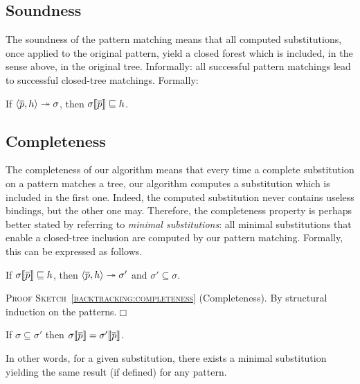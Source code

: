\subsection{Soundness}

The soundness of the pattern matching means that all computed
substitutions, once applied to the original pattern, yield a closed
forest which is included, in the sense above, in the original
tree. Informally: all successful pattern matchings lead to successful
closed\hyp{}tree matchings. Formally:
\begin{theorem}[Soundness]\hfill
\label{backtracking:soundness}
\begin{center}
If \(\smat{h}{\overline{p}} \twoheadrightarrow \sigma\),
then \(\subst{\overline{p}}{\sigma} \sqsubseteq h\).
\end{center}
\end{theorem}



\subsection{Completeness}

The completeness of our algorithm means that every time a complete
substitution on a pattern matches a tree, our algorithm computes a
substitution which is included in the first one. Indeed, the computed
substitution never contains useless bindings, but the other one
may. Therefore, the completeness property is perhaps better stated by
referring to \emph{minimal substitutions}: all minimal substitutions
that enable a closed\hyp{}tree inclusion are computed by our pattern
matching. Formally, this can be expressed as follows.
\begin{theorem}[Completeness]\hfill
\label{backtracking:completeness}
\begin{center}
If   \(\subst{\overline{p}}{\sigma} \sqsubseteq h\),
then \(\smat{h}{\overline{p}} \twoheadrightarrow \sigma'\) 
and  \(\sigma' \subseteq \sigma\).
\end{center}
\end{theorem}

\noindent\textsc{Proof Sketch~\ref{backtracking:completeness}}
(Completeness). By structural induction on the patterns.\hfill\(\Box\)

\begin{lemma}[Minimality]\hfill
\label{minimality}
\begin{center}
If \(\sigma \subseteq \sigma'\) 
then \(\subst{\overline{p}}{\sigma} = \subst{\overline{p}}{\sigma'}\).
\end{center}
\end{lemma}
\noindent In other words, for a given substitution, there exists a
minimal substitution yielding the same result (if defined) for any
pattern.

